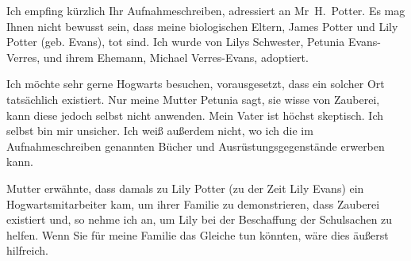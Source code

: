 \begin{writtenNote}


Ich empfing kürzlich Ihr Aufnahmeschreiben, adressiert an Mr~H.~Potter. Es mag Ihnen nicht bewusst sein, dass meine biologischen Eltern, James Potter und Lily Potter (geb. Evans), tot sind. Ich wurde von Lilys Schwester, Petunia Evans-Verres, und ihrem Ehemann, Michael Verres-Evans, adoptiert.

Ich möchte sehr gerne Hogwarts besuchen, vorausgesetzt, dass ein solcher Ort tatsächlich existiert. Nur meine Mutter Petunia sagt, sie wisse von Zauberei, kann diese jedoch selbst nicht anwenden. Mein Vater ist höchst skeptisch. Ich selbst bin mir unsicher. Ich weiß außerdem nicht, wo ich die im Aufnahmeschreiben genannten Bücher und Ausrüstungsgegenstände erwerben kann.

Mutter erwähnte, dass damals zu Lily Potter (zu der Zeit Lily Evans) ein Hogwartsmitarbeiter kam, um ihrer Familie zu demonstrieren, dass Zauberei existiert und, so nehme ich an, um Lily bei der Beschaffung der Schulsachen zu helfen. Wenn Sie für meine Familie das Gleiche tun könnten, wäre dies äußerst hilfreich.

\end{writtenNote}

